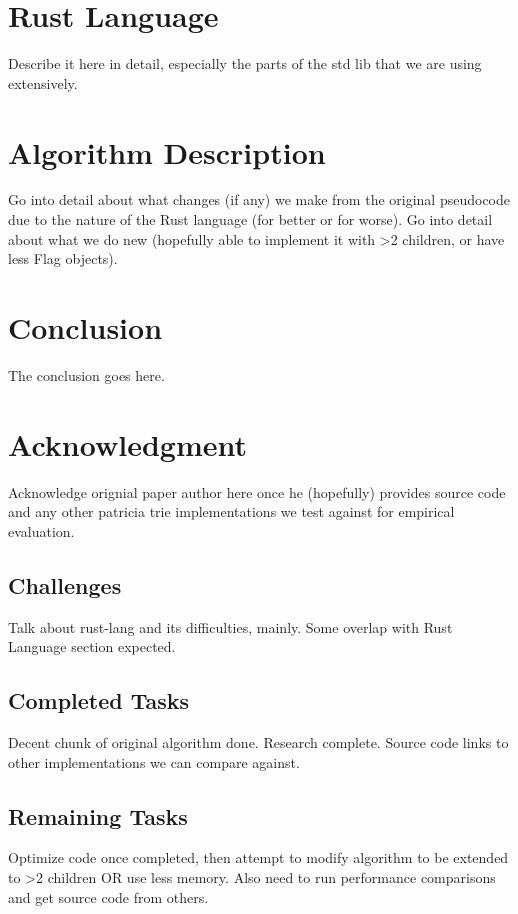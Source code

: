 \documentclass[conference]{IEEEtran}
\begin{document}
\section{Rust Language}
Describe it here in detail, especially the parts of the std lib that we are using extensively.


\section{Algorithm Description}
Go into detail about what changes (if any) we make from the original pseudocode due to the nature of the Rust language (for better or for worse). Go into detail about what we do new (hopefully able to implement it with >2 children, or have less Flag objects).


\section{Conclusion}
The conclusion goes here.


\section{Acknowledgment}
Acknowledge orignial paper author here once he (hopefully) provides source code and any other patricia trie implementations we test against for empirical evaluation.


\appendix
\subsection{Challenges}
Talk about rust-lang and its difficulties, mainly. Some overlap with Rust Language section expected.


\subsection{Completed Tasks}
Decent chunk of original algorithm done. Research complete. Source code links to other implementations we can compare against. 


\subsection{Remaining Tasks}
Optimize code once completed, then attempt to modify algorithm to be extended to >2 children OR use less memory.
Also need to run performance comparisons and get source code from others.




\end{document}
